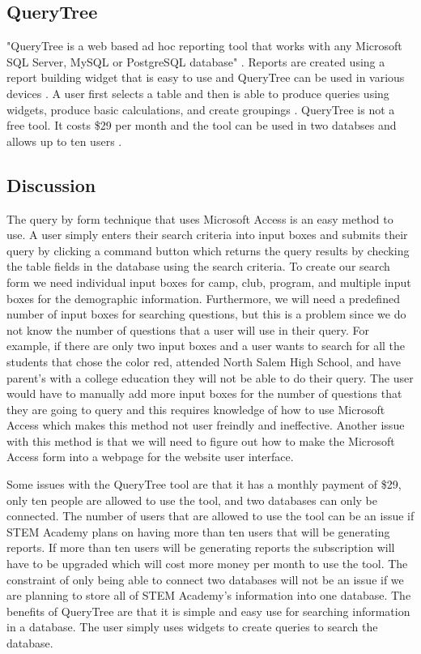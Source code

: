 \documentclass[letterpaper,10pt,serif, draftclsnofoot,onecolumn, compsoc, titlepage]{IEEEtran}
\begin{document}
\subsection{QueryTree}
"QueryTree is a web based ad hoc reporting tool that works with any Microsoft SQL Server, MySQL or PostgreSQL database" \cite{QueryTree}. Reports are created using a report building widget that is easy to use and QueryTree can be used in various devices \cite{QueryTree}. A user first selects a table and then is able to produce queries using widgets, produce basic calculations, and create groupings \cite{QueryTree}. QueryTree is not a free tool. It costs \$29 per month and the tool can be used in two databses and allows up to ten users \cite{QueryTree}. 

\subsection{Discussion}
The query by form technique that uses Microsoft Access is an easy method to use. A user simply enters their search criteria into input boxes and submits their query by clicking a command button which returns the query results by checking the table fields in the database using the search criteria. To create our search form we need individual input boxes for camp, club, program, and multiple input boxes for the demographic information. Furthermore, we will need a predefined number of input boxes for searching questions, but this is a problem since we do not know the number of questions that a user will use in their query. For example, if there are only two input boxes and a user wants to search for all the students that chose the color red, attended North Salem High School, and have parent's with a college education they will not be able to do their query. The user would have to manually add more input boxes for the number of questions that they are going to query and this requires knowledge of how to use Microsoft Access which makes this method not user freindly and ineffective. Another issue with this method is that we will need to figure out how to make the Microsoft Access form into a webpage for the website user interface. 

Some issues with the QueryTree tool are that it has a monthly payment of \$29, only ten people are allowed to use the tool, and two databases can only be connected. The number of users that are allowed to use the tool can be an issue if STEM Academy plans on having more than ten users that will be generating reports. If more than ten users will be generating reports the subscription will have to be upgraded which will cost more money per month to use the tool. The constraint of only being able to connect two databases will not be an issue if we are planning to store all of STEM Academy's information into one database. The benefits of QueryTree are that it is simple and easy use for searching information in a database. The user simply uses widgets to create queries to search the database. 
\end{document}
